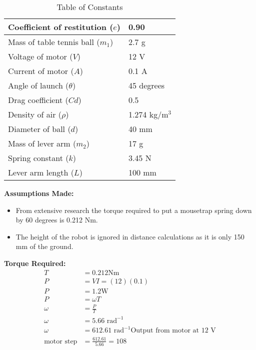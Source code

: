 \begin{homeworkProblem}
  \begin{table}[H]
\centering
\caption{Table of Constants}
\label{constantsTable}
\begin{tabular}{|l|l|}
\hline
Coefficient of restitution (\(e\)) & 0.90                \\ \hline
Mass of table tennis ball (\(m_1\))  & 2.7 g               \\ \hline
Voltage of motor (\(V\))           & 12 V                \\ \hline
Current of motor (\(A\))           & 0.1 A               \\ \hline
Angle of launch (\(\theta\))            & 45 degrees          \\ \hline
Drag coefficient (\(Cd\))           & 0.5                 \\ \hline
Density of air (\(\rho\))             & 1.274 kg/m\(^3\) \\ \hline
Diameter of ball (\(d\))           & 40 mm               \\ \hline
Mass of lever arm (\(m_2\))          & 17 g                \\ \hline
Spring constant (\(k\))               & 3.45 N              \\ \hline
Lever arm length (\(L\))           & 100 mm              \\ \hline
\end{tabular}
\end{table}

\textbf{Assumptions Made:}
\begin{itemize}
  \item From extensive research the torque required to put a mousetrap spring down by 60 degrees is 0.212 Nm.
  \item The height of the robot is ignored in distance calculations as it is only 150 mm of the ground.
\end{itemize}

\textbf{Torque Required:}
\begin{equation}
  \begin{split}
    T &= 0.212 \text{Nm}\\
    P &= VI = (12)(0.1)\\
    P &= 1.2 \text{W}\\
    P &= \omega T\\
    \omega &= \frac{P}{T}\\
    \omega &= 5.66 \text{ rad}^{-1}\\
    \omega &= 612.61 \text{ rad}^{-1} \text{Output from motor at 12 V}\\
    \text{motor step} &= \frac{612.61}{5.66} = 108
  \end{split}
\end{equation}


\end{homeworkProblem}
